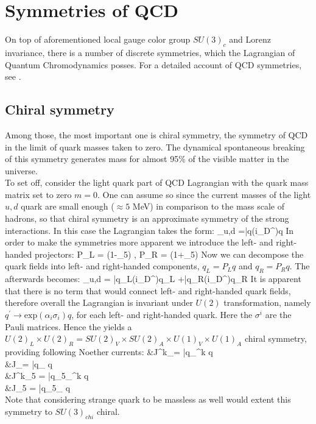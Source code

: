 \section{Symmetries of QCD}
	On top of aforementioned local gauge color group $SU(3)_c$ and Lorenz invariance, there is a number of discrete symmetries, which the Lagrangian of Quantum Chromodynamics posses. For a detailed account of QCD symmetries, see \cite{--}. 
	\subsection*{Chiral symmetry}
	Among those, the most important one is chiral symmetry, the symmetry of QCD in the limit of quark masses taken to zero. The dynamical spontaneous breaking of this symmetry generates mass for almost 95\% of the visible matter in the universe.   \\
	
	To set off, consider the light quark part of QCD Lagrangian \Eq{\ref{qcd_low:L_QCD}} with the quark mass matrix set to zero $m=0$. One can assume so since the current masses of the light $u,d$ quark are small enough ($\approx 5$ MeV) in comparison to the mass scale of hadrons, so that chiral symmetry is an approximate symmetry of the strong interactions. In this case the Lagrangian takes the form:
	\beqa
		\label{qcd_low:L_QCD_chiral}
		_{u,d} =\bar{q}(i\gamma_\mu D^\mu)q
	\eeqa	
	In order to make the symmetries more apparent we introduce the left- and right-handed projectors:
	\beqa
		P_L = (1-\gamma_5) \;, \;\;\;\;\;\;\;\;\;\;\;\; P_R = (1+\gamma_5)
	\eeqa
	Now we can decompose the quark fields into left- and right-handed components, $q_L = P_L q$ and $q_R = P_R q$. The \Eq{\ref{qcd_low:L_QCD_chiral}} afterwards becomes:
	\beqa
		\label{qcd_low:L_QCD_chiral_RL}
		_{u,d} = \bar{q_L}(i\gamma_\mu D^\mu)q_L +\bar{q_R}(i\gamma_\mu D^\mu)q_R
	\eeqa
	It is  apparent that there is no term that would connect left- and right-handed quark fields, therefore overall the Lagrangian is invariant under $U(2)$ transformation, namely $q^\prime \rightarrow \text{exp}(\alpha_i \sigma_i) q$, for each left- and right-handed quark. Here the $\sigma^i$ are the Pauli matrices. Hence the \Eq{\ref{qcd_low:L_QCD_chiral_RL}} yields a $U(2)_L \times U(2)_R = SU(2)_V \times SU(2)_A \times U(1)_V \times U(1)_A$ chiral symmetry, providing following Noether currents:
	\beqa
		\label{qcd_low:Noether_currents}
		&J^k_\mu = \bar{q}\gamma_{\mu}\sigma^k q \\
		&J_\mu = \bar{q}\gamma_{\mu} q\\ 
		&J^k_{5\mu} = \bar{q}\gamma_5\gamma_{\mu}\sigma^k q\\
		&J_{5\mu} = \bar{q}\gamma_5\gamma_{\mu} q\\ 
	\eeqa
	Note that considering strange quark to be massless as well would extent this symmetry to $SU(3)_{chi}$ chiral. 
	
